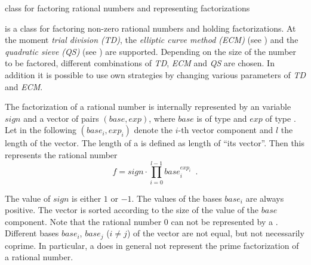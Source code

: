 
\newcommand{\base}{\mathit{base}}
\newcommand{\expt}{\mathit{exp}}
\newcommand{\sign}{\mathit{sign}}
\newcommand{\step}{\mathit{step}}
\newcommand{\upperbound}{\mathit{upper\uscore bound}}
\newcommand{\lowerbound}{\mathit{lower\uscore bound}}



\NAME

 \dotfill class for factoring rational
numbers and representing factorizations



\ABSTRACT

 is a class for factoring non-zero rational numbers and holding
factorizations.  At the moment \emph{trial division (TD)}, the \emph{elliptic curve method
  (ECM)} (see \cite{LenstraHW:1987}) and the \emph{quadratic sieve (QS)} (see
\cite{Pomerance:1982}) are supported.  Depending on the size of the number to be factored,
different combinations of \emph{ TD}, \emph{ECM} and \emph{QS} are chosen.  In addition it is
possible to use own strategies by changing various parameters of \emph{TD} and \emph{ECM}.



\DESCRIPTION

The factorization of a rational number is internally represented by an  variable
$\sign$ and a vector of pairs $(\base, \expt)$, where $\base$ is of type  and
$\expt$ of type .  Let in the following $(\base_i, \expt_i)$ denote the $i$-th vector
component and $l$ the length of the vector.  The length of a  is
defined as length of ``its vector''.  Then this  represents the
rational number
\begin{displaymath}
  f = \sign \cdot \prod_{i = 0}^{l-1} \base_i^{\expt_i} \enspace.
\end{displaymath}

The value of $\sign$ is either $1$ or $-1$.  The values of the bases $\base_i$ are always
positive.  The vector is sorted according to the size of the value of the $\base$ component.
Note that the rational number 0 can not be represented by a .
Different bases $\base_i$, $\base_j$ ($i \neq j$) of the vector are not equal, but not
necessarily coprime.  In particular, a  does in general not
represent the prime factorization of a rational number.

